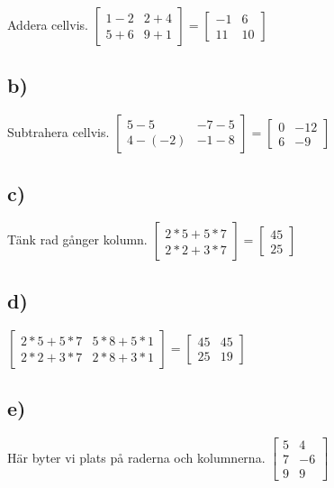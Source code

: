 Addera cellvis.
$ 
    			\begin{bmatrix}
    			1-2 & 2+4 \\
    			5+6 & 9+1
    			\end{bmatrix}
    			=
    			\begin{bmatrix}
    			-1 & 6 \\
    			11  & 10
    			\end{bmatrix}
    			$
    			
\subsection*{b)}
Subtrahera cellvis.
$ 
    			\begin{bmatrix}
    			5-5 & -7-5 \\
    			4-(-2) & -1-8
    			\end{bmatrix}
    			=
    			\begin{bmatrix}
    			0 & -12 \\
    			6  & -9
    			\end{bmatrix}
    			$
    			
\subsection*{c)}
Tänk rad gånger kolumn.
$ 
    			\begin{bmatrix}
    			2*5+5*7  \\
    			2*2+3*7
    			\end{bmatrix}
    			=
    			\begin{bmatrix}
    			45  \\
    			25
    			\end{bmatrix}
    			$

\subsection*{d)}

$ 
    			\begin{bmatrix}
    			2*5+5*7 & 5*8+5*1  \\
    			2*2+3*7 & 2*8+3*1
    			\end{bmatrix}
    			=
    			\begin{bmatrix}
    			45 & 45\\
    			25 & 19
    			\end{bmatrix}
    			$

\subsection*{e)}
Här byter vi plats på raderna och kolumnerna.
				$ 
    			\begin{bmatrix}
    			5 & 4 \\
    			7 & -6 \\
    			9 & 9 
    			\end{bmatrix}
    			$